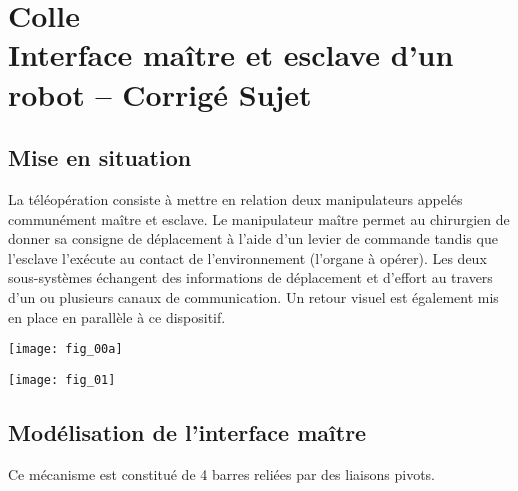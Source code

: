 \chapter*{Colle  \\ 
Interface maître et esclave d'un robot -- 
\ifprof Corrigé \else Sujet \fi}

\iflivret {} \else
\ifprof  {} \else \fi
\fi

\setcounter{question}{0}







\section*{Mise en situation}
\ifprof
\else
La téléopération consiste à mettre en relation deux manipulateurs appelés communément
maître et esclave. Le manipulateur maître permet au chirurgien de donner sa consigne de
déplacement à l’aide d’un levier de commande tandis que l’esclave l’exécute au contact de
l’environnement (l’organe à opérer). Les deux sous-systèmes échangent des informations de
déplacement et d’effort au travers d’un ou plusieurs canaux de communication. Un retour
visuel est également mis en place en parallèle à ce dispositif.

\begin{center}
\texttt{[image: fig\_00a]}
\end{center}
\fi
\begin{marginfigure}
\texttt{[image: fig\_01]}
\end{marginfigure}

\section*{Modélisation de l’interface maître}
\ifprof
\else

Ce mécanisme est constitué de 4 barres reliées par des liaisons pivots.



